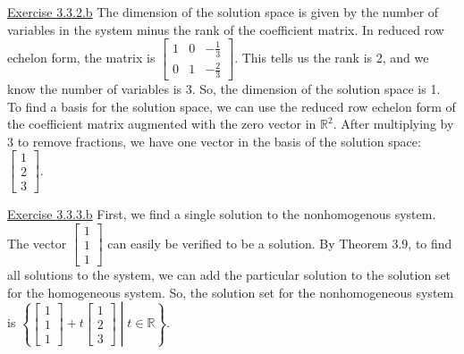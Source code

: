 \documentclass{exam}
\begin{document}
\underline{Exercise 3.3.2.b}
\newline
\newline
The dimension of the solution space is given by the number of variables in the system minus the rank of the coefficient matrix. In reduced row echelon form, the matrix is $
\begin{bmatrix}
    1 & 0 & -\frac{1}{3} \\
    0 & 1 & -\frac{2}{3}
\end{bmatrix}$. This tells us the rank is 2, and we know the number of variables is 3. So, the dimension of the solution space is 1. To find a basis for the solution space, we can use the reduced row echelon form of the coefficient matrix augmented with the zero vector in $\mathbb{R}^2$. After multiplying by 3 to remove fractions, we have one vector in the basis of the solution space: $
\begin{bmatrix}
    1 \\
    2 \\
    3
\end{bmatrix}$.
\newline

\underline{Exercise 3.3.3.b}
\newline
\newline
First, we find a single solution to the nonhomogenous system. The vector $
\begin{bmatrix}
    1 \\
    1 \\
    1
\end{bmatrix}$ can easily be verified to be a solution. By Theorem 3.9, to find all solutions to the system, we can add the particular solution to the solution set for the homogeneous system. So, the solution set for the nonhomogeneous system is $\left\{
\begin{bmatrix}
    1 \\
    1 \\
    1
\end{bmatrix} + t
\begin{bmatrix}
    1 \\
    2 \\
    3
\end{bmatrix}\middle|t\in\mathbb{R}
\right\}$.
\newline
\end{document}
